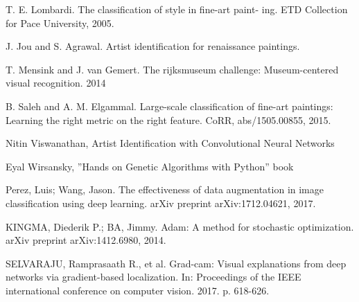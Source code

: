 \begin{thebibliography}{1}


T. E. Lombardi. The classification of style in fine-art paint- ing. ETD Collection for Pace University, 2005.

J. Jou and S. Agrawal. Artist identification for renaissance paintings.

T. Mensink and J. van Gemert. The rijksmuseum challenge: Museum-centered visual recognition. 2014

B. Saleh and A. M. Elgammal. Large-scale classification of fine-art paintings: Learning the right metric on the right feature. CoRR, abs/1505.00855, 2015.

Nitin Viswanathan, Artist Identification with Convolutional Neural Networks

Eyal Wirsansky, ”Hands on Genetic Algorithms with Python” book

Perez, Luis; Wang, Jason. The effectiveness of data augmentation in image classification using deep learning. arXiv preprint arXiv:1712.04621, 2017.

KINGMA, Diederik P.; BA, Jimmy. Adam: A method for stochastic optimization. arXiv preprint arXiv:1412.6980, 2014.

SELVARAJU, Ramprasaath R., et al. Grad-cam: Visual explanations from deep networks via gradient-based localization. In: Proceedings of the IEEE international conference on computer vision. 2017. p. 618-626.

\end{thebibliography}
